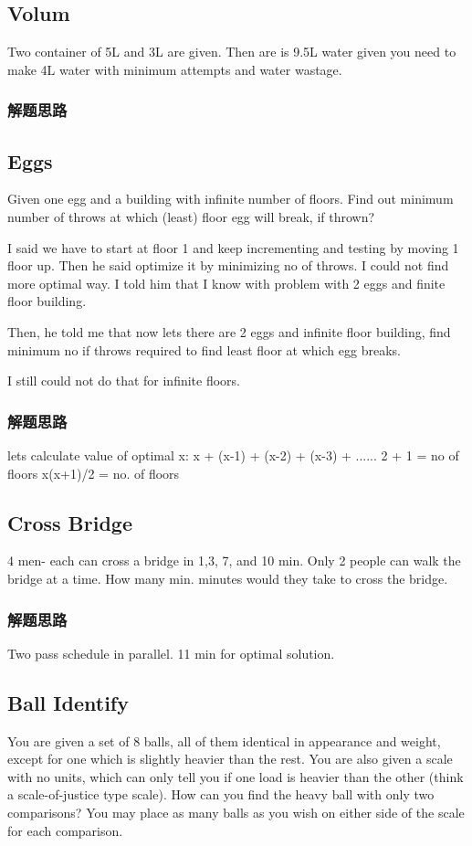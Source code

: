 \subsection{Volum}
Two container of 5L and 3L are given. Then are is 9.5L water given you need to make 4L water with minimum attempts and water wastage.

\subsubsection{解题思路}

\subsection{Eggs}
Given one egg and a building with infinite number of floors. Find out minimum number of throws at which (least) floor egg will break, if thrown? 

I said we have to start at floor 1 and keep incrementing and testing by moving 1 floor up. Then he said optimize it by minimizing no of throws. I could not find more optimal way. 
I told him that I know with problem with 2 eggs and finite floor building. 

Then, he told me that now lets there are 2 eggs and infinite floor building, find minimum no if throws required to find least floor at which egg breaks. 

I still could not do that for infinite floors.

\subsubsection{解题思路}
lets calculate value of optimal x: 
x + (x-1) + (x-2) + (x-3) + ...... 2 + 1 = no of floors 
x(x+1)/2 = no. of floors 

\subsection{Cross Bridge}
4 men- each can cross a bridge in 1,3, 7, and 10 min. 
Only 2 people can walk the bridge at a time. How many min. minutes would they take to cross the bridge.

\subsubsection{解题思路}
Two pass schedule in parallel.
11 min for optimal solution.

\subsection{Ball Identify}
You are given a set of 8 balls, all of them identical in appearance and weight, except for one which is slightly heavier than the rest. You are also given a scale with no units, 
which can only tell you if one load is heavier than the other (think a scale-of-justice type scale). How can you find the heavy ball with only two comparisons? You may place as 
many balls as you wish on either side of the scale for each comparison.

